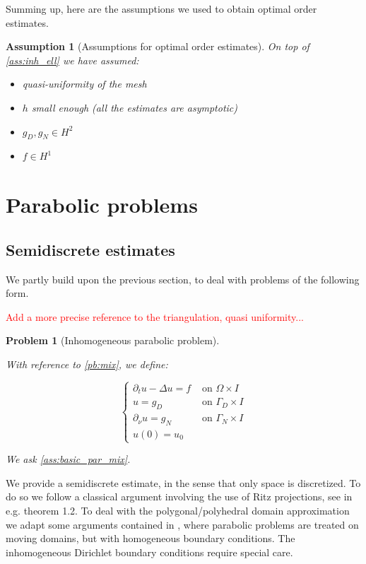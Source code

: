 \documentclass[english,a4paper,10pt,oneside]{scrbook}	%
\theoremstyle{break}
\newtheorem{ass}[equation]{Assumption}
\newtheorem{pb}[equation]{Problem}
\theoremstyle{remark}
\begin{document}
Summing up, here are the assumptions we used to obtain optimal order estimates.

\begin{ass}[Assumptions for optimal order estimates]
On top of \cref{ass:inh_ell} we have assumed:
\begin{itemize}
	\item quasi-uniformity of the mesh
	\item $h$ small enough (all the estimates are asymptotic)
	\item $g_D, g_N \in H^2$
	\item $f \in H^1$
\end{itemize}
\end{ass}

\section{Parabolic problems}

\subsection{Semidiscrete estimates}

We partly build upon the previous section, to deal with problems of the following form.

\textcolor{red}{Add a more precise reference to the triangulation, quasi uniformity...}

\begin{pb}[Inhomogeneous parabolic problem]
\label{pb:inh_parabolic}

With reference to \cref{pb:mix}, we define:

$$
\left\{\begin{matrix}
\partial_t u-\Delta u = f & \text{ on } \Omega \times I \\ 
u = g_D & \text{ on } \Gamma_D \times I\\ 
\partial_\nu u = g_N & \text{ on } \Gamma_N \times I \\
u(0) =  u_0
\end{matrix}\right.
$$

We ask \cref{ass:basic_par_mix}.

\end{pb}

We provide a semidiscrete estimate, in the sense that only space is discretized. To do so we follow a classical argument involving the use of Ritz projections, see \cite{thomee} in e.g. theorem 1.2. To deal with the polygonal/polyhedral domain approximation we adapt some arguments contained in \cite{ranner}, where parabolic problems are treated on moving domains, but with homogeneous boundary conditions. The inhomogeneous Dirichlet boundary conditions require special care.
\end{document}
